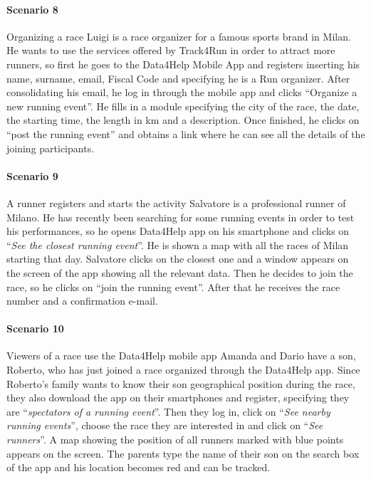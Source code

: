 \paragraph{Scenario 8} Organizing a race \newline
Luigi is a race organizer for a famous sports brand in Milan. He wants to use the services offered by Track4Run in order to attract more runners, so first he goes to the Data4Help Mobile App and registers inserting his name, surname, email, Fiscal Code and specifying he is a Run organizer. After consolidating his email, he log in through the mobile app and clicks “Organize a new running event”. He fills in a module specifying the city of the race, the date, the starting time, the length in km and a description. Once finished, he clicks on “post the running event” and obtains a link where he can see all the details of the joining participants.



\paragraph{Scenario 9} A runner registers and starts the activity \newline
Salvatore is a professional runner of Milano.  He has recently been searching for some running events in order to test his performances, so he opens Data4Help app on his smartphone and clicks on “\textit{See the closest running event}”.
He is shown a map with all the races of Milan starting that day. Salvatore clicks on the closest one and a window appears on the screen of the app showing all the relevant data. Then he decides to join the race, so he clicks on “join the running event”. After that he receives the race number and a confirmation e-mail.



\paragraph{Scenario 10} Viewers of a race use the Data4Help mobile app \newline
Amanda and Dario have a son, Roberto, who has just joined a race organized through the Data4Help app. Since Roberto’s family wants to know their son geographical position during the race, they also download the app on their smartphones and register, specifying they are “\textit{spectators of a running event}”. Then they log in, click on “\textit{See nearby running events}”, choose the race they are interested in and click on “\textit{See runners}”. A map showing the position of all runners marked with blue points appears on the screen. The parents type the name of their son on the search box of the app and  his location becomes red and can be tracked.
